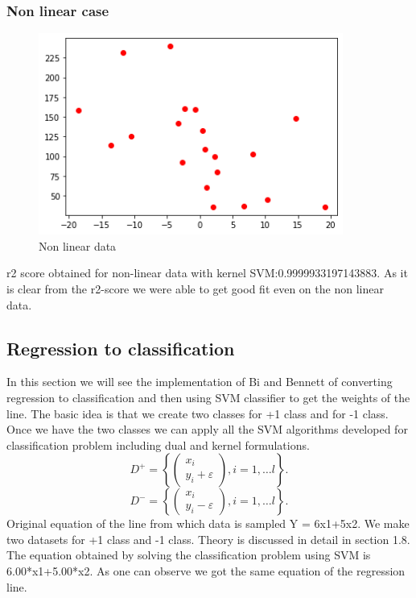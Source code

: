 \documentclass[../main.tex]{subfiles}
\begin{document}
\subsubsection{Non linear case}

    \begin{figure}[htp]
    \centering
    \includegraphics[width=10cm]{H13.png}
    \caption{Non linear data}
    \label{Non linear data}
    \end{figure}
r2 score obtained for non-linear data with kernel SVM:0.9999933197143883. As it is clear from the r2-score we were able to get good fit even on the non linear data.



\subsection{Regression to classification}
In this section we will see the implementation of Bi and Bennett of converting regression to classification and then using SVM classifier to get the weights of the line.
\newline
The basic idea is that we create two classes for +1 class and for -1 class. Once we have the two classes we can apply all the SVM algorithms developed for classification problem including dual and kernel formulations.
$$D^{+}=\left\{\left(\begin{array}{l}
x_{i} \\
y_{i}+\varepsilon
\end{array}\right), i=1, \ldots l\right\} .$$
$$D^{-}=\left\{\left(\begin{array}{l}
x_{i} \\
y_{i}-\varepsilon
\end{array}\right), i=1, \ldots l\right\} .$$
Original equation of the line from which data is sampled Y = 6x1+5x2. We make two datasets for +1 class and -1 class. Theory is discussed in detail in section 1.8.
The equation obtained by solving the classification problem using SVM is 
6.00*x1+5.00*x2. As one can observe we got the same equation of the regression line.
    
\end{document}
